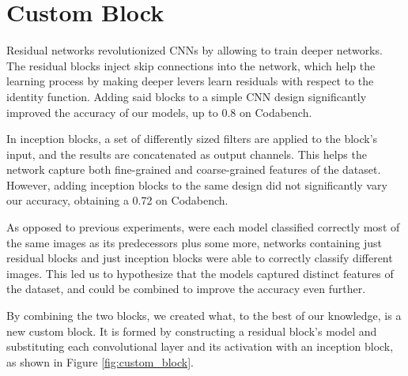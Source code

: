 \documentclass[11pt]{article}
\begin{document}
\begin{multicols}{2}


      \label{sec:custom_block}
      \section{Custom Block}

      Residual networks revolutionized CNNs by allowing to train deeper networks. The residual blocks inject skip connections into the network, which help the learning process by making deeper levers learn residuals with respect to the identity function. Adding said blocks to a simple CNN design significantly improved the accuracy of our models, up to 0.8 on Codabench.

      In inception blocks, a set of differently sized filters are applied to the block's input, and the results are concatenated as output channels. This helps the network capture both fine-grained and coarse-grained features of the dataset. However, adding inception blocks to the same design did not significantly vary our accuracy, obtaining a 0.72 on Codabench.

      As opposed to previous experiments, were each model classified correctly most of the same images as its predecessors plus some more, networks containing just residual blocks and just inception blocks were able to correctly classify different images. This led us to hypothesize that the models captured distinct features of the dataset, and could be combined to improve the accuracy even further.

      By combining the two blocks, we created what, to the best of our knowledge, is a new custom block. It is formed by constructing a residual block's model and substituting each convolutional layer and its activation with an inception block, as shown in Figure \ref{fig:custom_block}.


\end{multicols}
\end{document}
